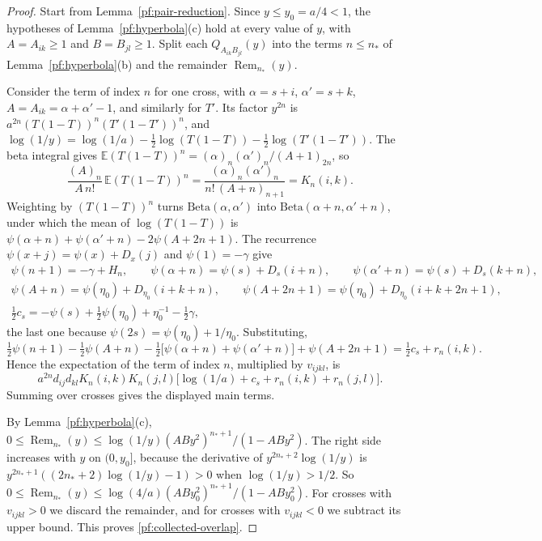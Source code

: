\begin{proof}
Start from Lemma~\ref{pf:pair-reduction}. Since $y\le y_0=a/4<1$, the
hypotheses of Lemma~\ref{pf:hyperbola}(c) hold at every value of $y$,
with $A=A_{ik}\ge1$ and $B=B_{jl}\ge1$. Split each
$Q_{A_{ik}B_{jl}}(y)$ into the terms $n\le n_*$ of
Lemma~\ref{pf:hyperbola}(b) and the remainder $\operatorname{Rem}_{n_*}(y)$.

Consider the term of index $n$ for one cross, with $\alpha=s+i$,
$\alpha'=s+k$, $A=A_{ik}=\alpha+\alpha'-1$, and similarly for $T'$. Its
factor $y^{2n}$ is $a^{2n}(T(1-T))^n(T'(1-T'))^n$, and
$\log(1/y)=\log(1/a)-\frac12\log(T(1-T))-\frac12\log(T'(1-T'))$. The
beta integral gives $\mathbb E(T(1-T))^n=(\alpha)_n(\alpha')_n/(A+1)_{2n}$,
so
\[
 \frac{(A)_n}{A\,n!}\,\mathbb E(T(1-T))^n
 =\frac{(\alpha)_n(\alpha')_n}{n!\,(A+n)_{n+1}}=K_n(i,k).
\]
Weighting by $(T(1-T))^n$ turns $\mathrm{Beta}(\alpha,\alpha')$ into
$\mathrm{Beta}(\alpha+n,\alpha'+n)$, under which the mean of
$\log(T(1-T))$ is $\psi(\alpha+n)+\psi(\alpha'+n)-2\psi(A+2n+1)$. The
recurrence $\psi(x+j)=\psi(x)+D_x(j)$ and $\psi(1)=-\gamma$ give
\[
 \begin{gathered}
 \psi(n+1)=-\gamma+H_n,\qquad
 \psi(\alpha+n)=\psi(s)+D_s(i+n),\qquad
 \psi(\alpha'+n)=\psi(s)+D_s(k+n),\\
 \psi(A+n)=\psi(\eta_0)+D_{\eta_0}(i+k+n),\qquad
 \psi(A+2n+1)=\psi(\eta_0)+D_{\eta_0}(i+k+2n+1),\\
 \tfrac12c_s=-\psi(s)+\tfrac12\psi(\eta_0)+\eta_0^{-1}-\tfrac12\gamma,
 \end{gathered}
\]
the last one because $\psi(2s)=\psi(\eta_0)+1/\eta_0$. Substituting,
\[
 \tfrac12\psi(n+1)-\tfrac12\psi(A+n)
 -\tfrac12\bigl[\psi(\alpha+n)+\psi(\alpha'+n)\bigr]+\psi(A+2n+1)
 =\tfrac12c_s+r_n(i,k).
\]
Hence the expectation of the term of index $n$, multiplied by
$v_{ijkl}$, is
\[
 a^{2n}d_{ij}d_{kl}K_n(i,k)K_n(j,l)\bigl[\log(1/a)+c_s+r_n(i,k)
 +r_n(j,l)\bigr].
\]
Summing over crosses gives the displayed main terms.

By Lemma~\ref{pf:hyperbola}(c),
$0\le\operatorname{Rem}_{n_*}(y)\le\log(1/y)(ABy^2)^{n_*+1}/(1-ABy^2)$. The right
side increases with $y$ on $(0,y_0]$, because the derivative of
$y^{2n_*+2}\log(1/y)$ is $y^{2n_*+1}((2n_*+2)\log(1/y)-1)>0$ when
$\log(1/y)>1/2$. So
$0\le\operatorname{Rem}_{n_*}(y)\le\log(4/a)(ABy_0^2)^{n_*+1}/(1-ABy_0^2)$. For
crosses with $v_{ijkl}>0$ we discard the remainder, and for crosses
with $v_{ijkl}<0$ we subtract its upper bound. This proves
\eqref{pf:collected-overlap}.
\end{proof}

